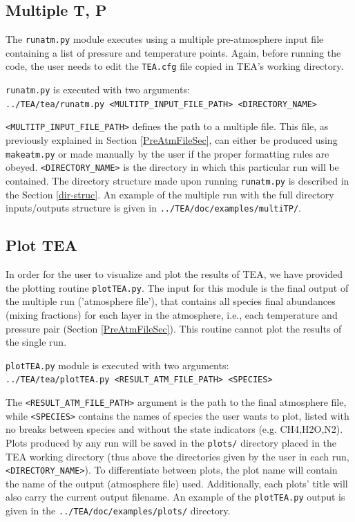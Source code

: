 {%
\subsection{Multiple T, P}
\label{exec-multi}

The \texttt{runatm.py} module executes using a multiple 
pre-atmosphere input file containing a list of pressure and
temperature points. Again, before running the code, the user needs to
edit the \texttt{TEA.cfg} file copied in TEA's working directory.

\texttt{runatm.py} is executed with two arguments:
\\ \texttt{../TEA/tea/runatm.py <MULTITP\_INPUT\_FILE\_PATH>
  <DIRECTORY\_NAME>}

\texttt{<MULTITP\_INPUT\_FILE\_PATH>} defines the path to a multiple
 file. This file, as previously explained in Section
\ref{PreAtmFileSec}, can either be produced using \texttt{makeatm.py} or
 made manually by the user if the proper formatting rules are obeyed.
\texttt{<DIRECTORY\_NAME>} is the directory in which this particular
 run will be contained. The directory structure made upon
running \texttt{runatm.py} is described in the Section
\ref{dir-struc}. An example of the multiple  run with the full
directory inputs/outputs structure is given in
\texttt{../TEA/doc/examples/multiTP/}.

\subsection{Plot TEA}
\label{plotTEA}

In order for the user to visualize and plot the results of TEA, we
have provided the plotting routine \texttt{plotTEA.py}. The input for
this module is the final output of the multiple  run
('atmosphere file'), that contains all species final abundances
(mixing fractions) for each layer in the atmosphere, i.e., each
temperature and pressure pair (Section
\ref{PreAtmFileSec}). This routine cannot plot the results of the single
 run.

\texttt{plotTEA.py} module is executed with two arguments:\\
\texttt{../TEA/tea/plotTEA.py <RESULT\_ATM\_FILE\_PATH> <SPECIES>}

The \texttt{<RESULT\_ATM\_FILE\_PATH>} argument is the path to the
final atmosphere file, while \texttt{<SPECIES>} contains the names of
species the user wants to plot, listed with no breaks between species
and without the state indicators (e.g. CH4,H2O,N2).  Plots produced by
any run will be saved in the \texttt{plots/} directory placed in the
TEA working directory (thus above the directories given by the user in
each run,
\texttt{<DIRECTORY\_NAME>}). To differentiate between plots, the plot
name will contain the name of the output (atmosphere file)
used. Additionally, each plots' title will also carry the current
output filename. An example of the
\texttt{plotTEA.py} output is given in the
\texttt{../TEA/doc/examples/plots/} directory.


}
